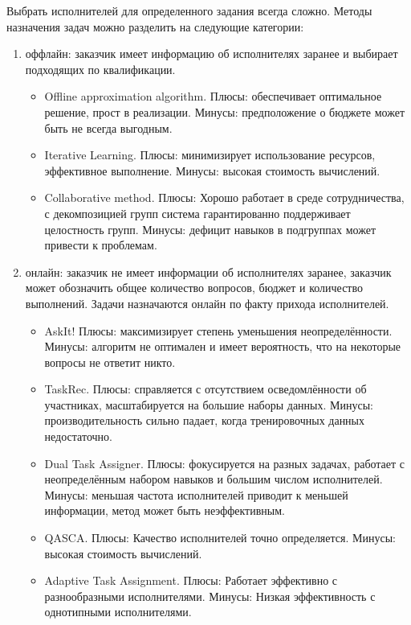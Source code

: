 \documentclass[specification,annotation,times]{itmo-student-thesis}
\begin{document}
Выбрать исполнителей для определенного задания всегда сложно.
Методы назначения задач можно разделить на следующие категории:
\begin{enumerate}
    \item оффлайн: заказчик имеет информацию об исполнителях заранее и выбирает подходящих по квалификации.
    \begin{itemize}
        \item Offline approximation algorithm. Плюсы: обеспечивает оптимальное решение, прост в реализации. Минусы: предположение о бюджете может быть не всегда выгодным.
        \item Iterative Learning. Плюсы: минимизирует использование ресурсов, эффективное выполнение. Минусы: высокая стоимость вычислений.
        \item Collaborative method. Плюсы: Хорошо работает в среде сотрудничества, с декомпозицией групп система гарантированно поддерживает целостность групп. Минусы: дефицит навыков в подгруппах может привести к проблемам.
    \end{itemize}
    \item онлайн: заказчик не имеет информации об исполнителях заранее, заказчик может обозначить общее количество вопросов, бюджет и количество выполнений. Задачи назначаются онлайн по факту прихода исполнителей.
    \begin{itemize}
        \item AskIt! Плюсы: максимизирует степень уменьшения неопределённости. Минусы: алгоритм не оптимален и имеет вероятность, что на некоторые вопросы не ответит никто.
        \item TaskRec. Плюсы: справляется с отсутствием осведомлённости об участниках, масштабируется на большие наборы данных. Минусы: производительность сильно падает, когда тренировочных данных недостаточно.
        \item Dual Task Assigner. Плюсы: фокусируется на разных задачах, работает с неопределённым набором навыков и большим числом исполнителей. Минусы: меньшая частота исполнителей приводит к меньшей информации, метод может быть неэффективным.
        \item QASCA. Плюсы: Качество исполнителей точно определяется. Минусы: высокая стоимость вычислений.
        \item Adaptive Task Assignment. Плюсы: Работает эффективно с разнообразными исполнителями. Минусы: Низкая эффективность с однотипными исполнителями.
    \end{itemize}
\end{enumerate}
\end{document}
